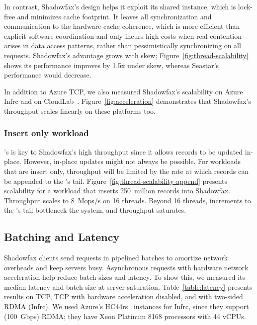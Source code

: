 In contrast, Shadowfax's design helps it exploit its shared \faster instance,
which is lock-free and minimizes cache footprint.
%
It leaves all synchronization and communication to the hardware
cache coherence, which is more efficient than explicit software
coordination and only incurs high costs when real contention arises in data
access patterns, rather than pessimistically synchronizing on all requests.
%
Shadowfax's advantage grows with skew;
Figure~\ref{fig:thread-scalability} shows its performance improves by 1.5x
under skew, whereas Seastar's performance would decrease.
%
%

In addition to Azure TCP, we also measured Shadowfax's scalability on
Azure Infrc and on CloudLab~\cite{cloudlab}.
%
Figure~\ref{fig:acceleration} demonstrates that Shadowfax's throughput
scales linearly on these platforms too.

\subsubsection{Insert only workload}
\label{sec:eval:append-only}

\faster's \hlog is key to Shadowfax's high throughput since it allows
records to be updated in-place.
%
However, in-place updates might not always be possible.
%
For workloads that are insert only, throughput will be limited by the
rate at which records can be appended to the \hlog's tail.
%
Figure~\ref{fig:thread-scalability-append} presents scalability for a
workload that inserts 250~million records into Shadowfax.
%
Throughput scales to 8~Mops/s on 16 threads.
%
Beyond 16 threads, increments to the \hlog's tail bottleneck the system,
and throughput saturates.

\subsection{Batching and Latency}
\label{sec:eval:latency}

Shadowfax clients send requests in pipelined batches to amortize
network overheads and keep servers busy.
%
Asynchronous requests with hardware network acceleration
help reduce batch sizes and latency.
%
To show this, we measured its median latency and batch size at
server saturation.
%
%
Table~\ref{table:latency} presents results on TCP, TCP with
hardware acceleration disabled, and with two-sided RDMA (Infrc).
%
We used Azure's HC44rs~\cite{hc44} instances for Infrc, since they support
(100~Gbps) RDMA; they have Xeon Platinum 8168 processors with 44 vCPUs.
%
%
%

